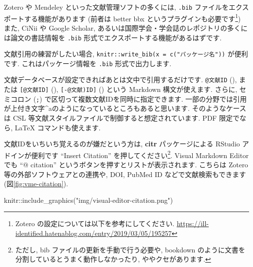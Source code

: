 \documentclass[
]{bxjsarticle}
\newenvironment{Shaded}{\begin{snugshade}}{\end{snugshade}}
\newcommand{\FunctionTok}[1]{\textcolor[rgb]{0.00,0.00,0.00}{#1}}
\newcommand{\NormalTok}[1]{#1}
\newcommand{\SpecialCharTok}[1]{\textcolor[rgb]{0.00,0.00,0.00}{#1}}
\newcommand{\StringTok}[1]{\textcolor[rgb]{0.31,0.60,0.02}{#1}}
\begin{document}
Zotero や Mendeley といった文献管理ソフトの多くには, \texttt{.bib} ファイルをエクスポートする機能があります (前者は better bbx というプラグインも必要です\footnote{Zotero の設定については以下を参考にしてください. \url{https://ill-identified.hatenablog.com/entry/2019/03/05/195257}}) また, CiNii や Google Scholar, あるいは国際学会・学会誌のレポジトリの多くには論文の書誌情報を \texttt{.bib} 形式でエクスポートする機能があるはずです.

文献引用の練習がしたい場合, \texttt{knitr::write\_bib(x\ =\ c("パッケージ名"))} が便利です. これはパッケージ情報を \texttt{.bib} 形式で出力します.

文献データベースが設定できればあとは文中で引用するだけです. \texttt{@文献ID} (\textcite{R-rmarkdown}), または \texttt{{[}@文献ID{]}} (\autocite{R-bookdown}), \texttt{{[}-@文献)ID{]}} (\autocite*{R-citr}) という Markdown 構文が使えます. さらに, セミコロン (\texttt{;}) で区切って複数文献IDを同時に指定できます. 一部の分野では引用が上付き文字\^{}aのようになっているところもあると思います. そのようなケースは CSL 等文献スタイルファイルで制御すると想定されています. PDF 限定でなら, LaTeX コマンドも使えます.

文献IDをいちいち覚えるのが嫌だという方は, \textbf{citr} パッケージによる RStudio アドインが便利です ``Insert Citation'' を押してください\footnote{ただし, bib ファイルの更新を手動で行う必要や, bookdown のように文書を分割しているとうまく動作しなかったり, ややクセがあります.}. Visual Markdown Editor でも ``@ citation'' というボタンを押すとリストが表示されます. こちらは Zotero 等の外部ソフトウェアとの連携や, DOI, PubMed ID などで文献検索もできます (図\ref{fig:vme-citation}).

\begin{Shaded}
\begin{Highlighting}[numbers=left,,]
\NormalTok{knitr}\SpecialCharTok{::}\FunctionTok{include\_graphics}\NormalTok{(}\StringTok{"img/visual{-}editor{-}citation.png"}\NormalTok{)}
\end{Highlighting}
\end{Shaded}
\end{document}
